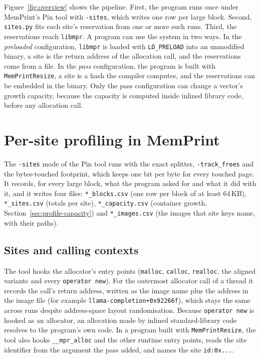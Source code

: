 \documentclass[11pt]{article}
\newcommand{\memprint}{MemPrint}
\newcommand{\libmpr}{\texttt{libmpr}}
\newcommand{\pass}{\texttt{MemPrintResize}}
\newcommand{\secref}[1]{Section~\ref{#1}}
\newcommand{\figref}[1]{Figure~\ref{#1}}
\newcommand{\term}[1]{\emph{#1}}
\begin{document}
\figref{fig:overview} shows the pipeline. First, the program runs once under \memprint{}'s Pin tool with
\texttt{-sites}, which writes one row per large block. Second, \texttt{sites.py} fits each site's reservation
from one or more such runs. Third, the reservations reach \libmpr{}. A program can use the system in two ways.
In the \term{preloaded} configuration, \libmpr{} is loaded with \texttt{LD\_PRELOAD} into an unmodified binary,
a site is the return address of the allocation call, and the reservations come from a file. In the
\term{pass} configuration, the program is built with \pass{}, a site is a hash the compiler computes, and the
reservations can be embedded in the binary. Only the pass configuration can change a vector's growth capacity,
because the capacity is computed inside inlined library code, before any allocation call.

\section{Per-site profiling in \memprint{}}
\label{sec:profile}

The \texttt{-sites} mode of the Pin tool runs with the exact splitter, \texttt{-track\_frees} and the
bytes-touched footprint, which keeps one bit per byte for every touched page. It records, for every large block,
what the program asked for and what it did with it, and it writes four files: \texttt{*\_blocks.csv} (one row per
block of at least 64\,KB), \texttt{*\_sites.csv} (totals per site), \texttt{*\_capacity.csv} (container growth,
\secref{sec:profile-capacity}) and \texttt{*\_images.csv} (the images that site keys name, with their paths).

\subsection{Sites and calling contexts}

The tool hooks the allocator's entry points (\texttt{malloc}, \texttt{calloc}, \texttt{realloc}, the aligned
variants and every \texttt{operator new}). For the outermost allocator call of a thread it records the call's
return address, written as the image name plus the address in the image file (for example
\texttt{llama-completion+0x92266f}), which stays the same across runs despite address-space layout
randomisation. Because \texttt{operator new} is hooked as an allocator, an allocation made by inlined
standard-library code resolves to the program's own code. In a program built with \pass{}, the tool also hooks
\texttt{\_\_mpr\_alloc} and the other runtime entry points, reads the site identifier from the argument the pass
added, and names the site \texttt{id:0x...}.
\end{document}
